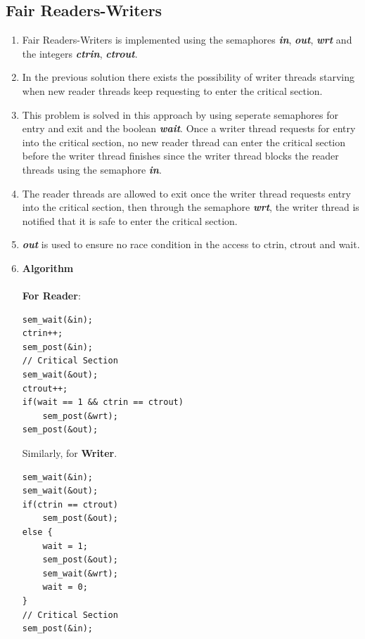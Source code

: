 \documentclass[a4paper,12pt]{report}
\begin{document}
\subsection{Fair Readers-Writers}
\begin{enumerate}
\item Fair Readers-Writers is implemented using the semaphores \textbf{\textit{in}}, \textbf{\textit{out}}, \textbf{\textit{wrt}} and the integers \textbf{\textit{ctrin}}, \textbf{\textit{ctrout}}.
\item In the previous solution there exists the possibility of writer threads starving when new reader threads keep requesting to enter the critical section.
\item This problem is solved in this approach by using seperate semaphores for entry and exit and the boolean \textit{\textbf{wait}}. Once a writer thread requests for entry into the critical section, no new reader thread can enter the critical section before the writer thread finishes since the writer thread blocks the reader threads using the semaphore \textbf{\textit{in}}.
\item The reader threads are allowed to exit once the writer thread requests entry into the critical section, then through the semaphore \textbf{\textit{wrt}}, the writer thread is notified that it is safe to enter the critical section.
\item \textbf{\textit{out}} is used to ensure no race condition in the access to ctrin, ctrout and wait.
\item \textbf{Algorithm}\\\\
\textbf{For Reader}:
\begin{lstlisting}
sem_wait(&in);
ctrin++;
sem_post(&in);
// Critical Section
sem_wait(&out);
ctrout++;
if(wait == 1 && ctrin == ctrout)
	sem_post(&wrt);
sem_post(&out);
\end{lstlisting}
Similarly, for \textbf{Writer}.
\begin{lstlisting}
sem_wait(&in);
sem_wait(&out);
if(ctrin == ctrout)
	sem_post(&out);
else {
	wait = 1;
	sem_post(&out);
	sem_wait(&wrt);
	wait = 0;
}
// Critical Section
sem_post(&in);
\end{lstlisting}
\end{enumerate}
\end{document}
